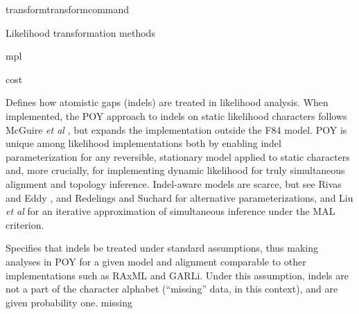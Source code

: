 \begin{command}{transform}{transformcommand}
\begin{arguments}
\begin{argumentgroup}{Likelihood transformation methods}
{\begin{description}
{%
                            }
                            {mpl}

                    \end{description}}
                    {cost}

                    {Defines how atomistic gaps (indels) are treated in
                    likelihood analysis. When implemented, the POY approach to
                    indels on static likelihood characters follows McGuire \emph{et al} \cite{mcguire2001models}, but expands the implementation outside the F84
                    model. POY is unique among likelihood implementations both
                    by enabling indel parameterization for any reversible,
                    stationary model applied to static characters and, more
                    crucially, for implementing dynamic likelihood for truly
                    simultaneous alignment and topology inference. Indel-aware
                    models are scarce, but see Rivas and Eddy \cite{rivas2008probabilistic}, and Redelings and Suchard \cite{redelings2005joint,redelings2007incorporating}
                    for alternative parameterizations,
                    and Liu \emph{et al} \cite{liu2009rapid} for an iterative approximation of
                    simultaneous inference under the MAL criterion.

                    \begin{description}

                            {Specifies that indels be treated under standard
                            assumptions, thus making analyses in POY for a given
                            model and alignment comparable to other
                            implementations such as RAxML and GARLi. Under this
                            assumption, indels are not a part of the character
                            alphabet (``missing'' data, in this context), and
                            are given probability one.}
                            {missing}


\end{description}}
\end{argumentgroup}
\end{arguments}
\end{command}
